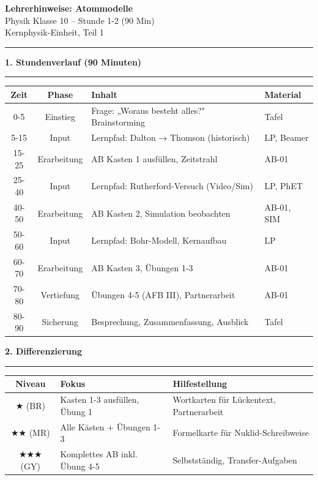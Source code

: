 \documentclass[11pt, a4paper]{article}
\newcommand{\abschnitt}[1]{%
    \vspace{10pt}\noindent\textbf{\textcolor{physik}{\large #1}}\vspace{6pt}\hrule\vspace{8pt}
}
\begin{document}
\begin{center}
{\LARGE\bfseries Lehrerhinweise: Atommodelle}\\[6pt]
{\large Physik Klasse 10 -- Stunde 1-2 (90 Min)}\\[4pt]
{\small\textcolor{grau}{Kernphysik-Einheit, Teil 1}}
\end{center}
\vspace{8pt}\hrule\vspace{12pt}

\abschnitt{1. Stundenverlauf (90 Minuten)}

\begin{tabularx}{\textwidth}{|c|c|X|l|}
\hline
\textbf{Zeit} & \textbf{Phase} & \textbf{Inhalt} & \textbf{Material} \\
\hline
0-5 & Einstieg & Frage: „Woraus besteht alles?" Brainstorming & Tafel \\
\hline
5-15 & Input & Lernpfad: Dalton → Thomson (historisch) & LP, Beamer \\
\hline
15-25 & Erarbeitung & AB Kasten 1 ausfüllen, Zeitstrahl & AB-01 \\
\hline
25-40 & Input & Lernpfad: Rutherford-Versuch (Video/Sim) & LP, PhET \\
\hline
40-50 & Erarbeitung & AB Kasten 2, Simulation beobachten & AB-01, SIM \\
\hline
50-60 & Input & Lernpfad: Bohr-Modell, Kernaufbau & LP \\
\hline
60-70 & Erarbeitung & AB Kasten 3, Übungen 1-3 & AB-01 \\
\hline
70-80 & Vertiefung & Übungen 4-5 (AFB III), Partnerarbeit & AB-01 \\
\hline
80-90 & Sicherung & Besprechung, Zusammenfassung, Ausblick & Tafel \\
\hline
\end{tabularx}

\vspace{12pt}

\abschnitt{2. Differenzierung}

\begin{tabularx}{\textwidth}{|c|X|X|}
\hline
\textbf{Niveau} & \textbf{Fokus} & \textbf{Hilfestellung} \\
\hline
★ (BR) & Kasten 1-3 ausfüllen, Übung 1 & Wortkarten für Lückentext, Partnerarbeit \\
\hline
★★ (MR) & Alle Kästen + Übungen 1-3 & Formelkarte für Nuklid-Schreibweise \\
\hline
★★★ (GY) & Komplettes AB inkl. Übung 4-5 & Selbstständig, Transfer-Aufgaben \\
\hline
\end{tabularx}
\end{document}

